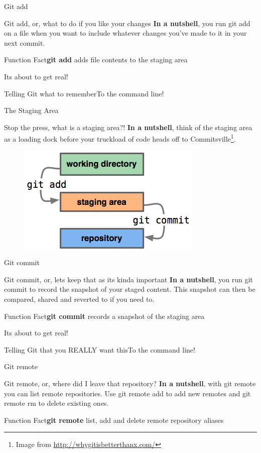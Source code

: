 \documentclass{beamer}
\newcommand{\demo}[1]{\begin{frame}{Its about to get real!}\begin{exampleblock}{#1}To the command line!\end{exampleblock}\end{frame}}
\newcommand{\clfact}[2]{\begin{alertblock}{Function Fact}\textbf{#1} #2\end{alertblock}}
\begin{document}
\begin{frame}{Git add}
    \begin{block}{Git add, or, what to do if you like your changes}
    \textbf{In a nutshell}, you run git add on a file when you want to include whatever changes you've made to it in your next commit.
    
    \end{block}
    \clfact{git add}{adds file contents to the staging area}
\end{frame}
\demo{Telling Git what to remember}

\begin{frame}{The Staging Area}
    \begin{block}{Stop the press, what is a staging area?!}
    \textbf{In a nutshell}, think of the staging area as a loading dock before your truckload of code heads off to Commitsville\footnote{Image from \href{http://whygitisbetterthanx.com/}{http://whygitisbetterthanx.com/}}.
    \begin{figure}[ht]
        \centering
        \includegraphics[width=0.5\linewidth]{img/staging.png}
        \label{fig:figure3}
    \end{figure}
    \end{block}
\end{frame}

\begin{frame}{Git commit}
    \begin{block}{Git commit, or, lets keep that as its kinda important}
    \textbf{In a nutshell}, you run git commit to record the snapshot of your staged content. This snapshot can then be compared, shared and reverted to if you need to.
    
    \end{block}
    \clfact{git commit}{records a snapshot of the staging area}
\end{frame}
\demo{Telling Git that you REALLY want this}

\begin{frame}{Git remote}
    \begin{block}{Git remote, or, where did I leave that repository?}
    \textbf{In a nutshell}, with git remote you can list remote repositories. Use git remote add to add new remotes and git remote rm to delete existing ones.
    
    \end{block}
    \clfact{git remote}{list, add and delete remote repository aliases}
\end{frame}
\end{document}
